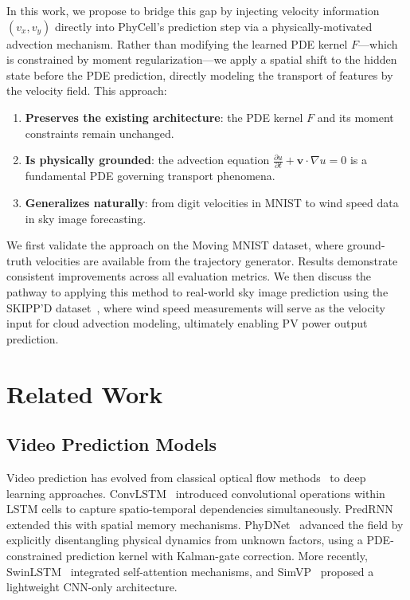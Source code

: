 \documentclass[11pt,a4paper]{article}
\begin{document}
In this work, we propose to bridge this gap by injecting velocity information $(v_x, v_y)$ directly into PhyCell's prediction step via a physically-motivated advection mechanism. Rather than modifying the learned PDE kernel $F$---which is constrained by moment regularization---we apply a spatial shift to the hidden state before the PDE prediction, directly modeling the transport of features by the velocity field. This approach:

\begin{enumerate}[nosep]
    \item \textbf{Preserves the existing architecture}: the PDE kernel $F$ and its moment constraints remain unchanged.
    \item \textbf{Is physically grounded}: the advection equation $\frac{\partial u}{\partial t} + \mathbf{v} \cdot \nabla u = 0$ is a fundamental PDE governing transport phenomena.
    \item \textbf{Generalizes naturally}: from digit velocities in MNIST to wind speed data in sky image forecasting.
\end{enumerate}

We first validate the approach on the Moving MNIST dataset, where ground-truth velocities are available from the trajectory generator. Results demonstrate consistent improvements across all evaluation metrics. We then discuss the pathway to applying this method to real-world sky image prediction using the SKIPP'D dataset~\cite{skippd}, where wind speed measurements will serve as the velocity input for cloud advection modeling, ultimately enabling PV power output prediction.

\section{Related Work}
\label{sec:related}

\subsection{Video Prediction Models}

Video prediction has evolved from classical optical flow methods~\cite{horn1981determining, lucas1981iterative} to deep learning approaches. ConvLSTM~\cite{shi2015convlstm} introduced convolutional operations within LSTM cells to capture spatio-temporal dependencies simultaneously. PredRNN~\cite{wang2017predrnn} extended this with spatial memory mechanisms. PhyDNet~\cite{leguen2020phydnet} advanced the field by explicitly disentangling physical dynamics from unknown factors, using a PDE-constrained prediction kernel with Kalman-gate correction. More recently, SwinLSTM~\cite{tang2023swinlstm} integrated self-attention mechanisms, and SimVP~\cite{gao2022simvp} proposed a lightweight CNN-only architecture.
\end{document}
